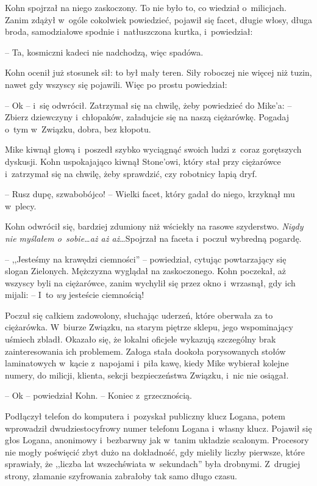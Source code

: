 \documentclass[oneside,polish,11pt,sfheadings]{mwbk}
\begin{document}
Kohn spojrzał na niego zaskoczony. To nie było to, co wiedział o~milicjach. Zanim zdążył w~ogóle cokolwiek powiedzieć, pojawił się facet,
długie włosy, długa broda, samodziałowe spodnie i~natłuszczona kurtka, i~powiedział:

 -- Ta, kosmiczni kadeci nie nadchodzą, więc spadówa.

Kohn ocenił już stosunek sił: to był mały teren. Siły roboczej nie
więcej niż tuzin, nawet gdy wszyscy się pojawili. Więc po prostu
powiedział: 

-- Ok -- i~się odwrócił. Zatrzymał się na chwilę, żeby
powiedzieć do Mike'a: -- Zbierz dziewczyny i~chłopaków, załadujcie się na
naszą ciężarówkę. Pogadaj o~tym w~Związku, dobra, bez kłopotu.

Mike kiwnął głową i~poszedł szybko wyciągnąć swoich ludzi z~coraz
gorętszych dyskusji. Kohn uspokajająco kiwnął Stone'owi, który stał przy
ciężarówce i~zatrzymał się na chwilę, żeby sprawdzić, czy robotnicy
łapią dryf.

-- Rusz dupę, szwabobójco! -- Wielki facet, który gadał do niego, krzyknął
mu w~plecy.

Kohn odwrócił się, bardziej zdumiony niż wściekły na rasowe szyderstwo.
\emph{Nigdy nie myślałem o~sobie\ldots aż aż aż}\ldots Spojrzał na faceta i~poczuł wybredną pogardę.

-- ,,Jesteśmy na krawędzi ciemności'' -- powiedział, cytując powtarzający
się slogan Zielonych. Mężczyzna wyglądał na zaskoczonego. Kohn poczekał,
aż wszyscy byli na ciężarówce, zanim wychylił się przez okno i~wrzasnął,
gdy ich mijali: -- I~to \emph{wy} jesteście ciemnością!

Poczuł się całkiem zadowolony, słuchając uderzeń, które oberwała za to
ciężarówka. W~biurze Związku, na starym piętrze sklepu, jego
wspominający uśmiech zbladł. Okazało się, że lokalni oficjele wykazują
szczególny brak zainteresowania ich problemem. Załoga stała dookoła
porysowanych stołów laminatowych w~kącie z~napojami i~piła kawę, kiedy
Mike wybierał kolejne numery, do milicji, klienta, sekcji bezpieczeństwa
Związku, i~nic nie osiągał.

-- Ok -- powiedział Kohn. -- Koniec z~grzecznością.

Podłączył telefon do komputera i~pozyskał publiczny klucz Logana, potem
wprowadził dwudziestocyfrowy numer telefonu Logana i~własny klucz.
Pojawił się głos Logana, anonimowy i~bezbarwny jak w~tanim układzie
scalonym. Procesory nie mogły poświęcić zbyt dużo na dokładność, gdy
mieliły liczby pierwsze, które sprawiały, że ,,liczba lat wszechświata w~sekundach'' była drobnymi. Z~drugiej strony, złamanie szyfrowania
zabrałoby tak samo długo czasu.
\end{document}
